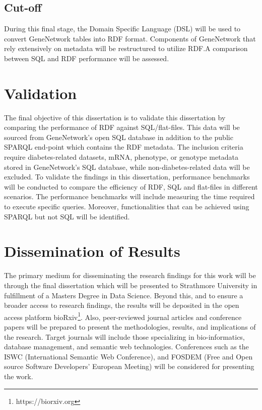 \subsection{Cut-off}

During this final stage, the Domain Specific Language (DSL) will be used to convert GeneNetwork tables into RDF format.  Components of GeneNetwork that rely extensively on metadata will be restructured to utilize RDF.\@  A comparison between SQL and RDF performance will be assessed.

\section{Validation}

The final objective of this dissertation is to validate this dissertation by comparing the performance of RDF against SQL/flat-files.  This data will be sourced from GeneNetwork's open SQL database in addition to the public SPARQL end-point which contains the RDF metadata.  The inclusion criteria require diabetes-related datasets, mRNA, phenotype, or genotype metadata stored in GeneNetwork's SQL database, while non-diabetes-related data will be excluded.  To validate the findings in this dissertation, performance benchmarks will be conducted to compare the efficiency of RDF, SQL and flat-files in different scenarios.  The performance benchmarks will include measuring the time required to execute specific queries.  Moreover, functionalities that can be achieved using SPARQL but not SQL will be identified.

\section{Dissemination of Results}

The primary medium for disseminating the research findings for this work will be through the final dissertation which will be presented to Strathmore University in fulfillment of a Masters Degree in Data Science.  Beyond this,
and to ensure a broader access to research findings, the results will be deposited in the open access platform bioRxiv\footnote{https://biorxiv.org}.  Also, peer-reviewed journal articles and conference papers will be prepared to present the methodologies, results, and implications of the research.  Target journals will include those specializing in bio-informatics, database management, and semantic web technologies.  Conferences such as the ISWC (International Semantic Web Conference), and FOSDEM (Free and Open source Software Developers' European Meeting) will be considered for presenting the work.


